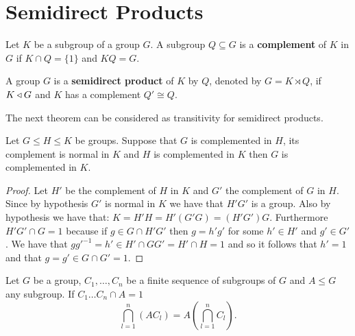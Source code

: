 \section{Semidirect Products}

\begin{definition}
    Let $K$ be a subgroup of a group $G$. A subgroup $Q \subseteq G$ is a \textbf{complement} of $K$ in $G$ if $K \cap Q = \{1\}$ and $KQ = G$.
\end{definition}

\begin{definition}
    A group $G$ is a \textbf{semidirect product} of $K$ by $Q$, denoted by $G = K \rtimes Q$, if $K \triangleleft G$ and $K$ has a complement $Q' \cong Q$.

\end{definition}

The next theorem can be considered as transitivity for semidirect products.

\begin{theorem}
\label{smdptrans}
Let $G \le H \le K$ be groups. Suppose that $G$ is complemented in $H$, its complement is normal in $K$ and $H$ is complemented in $K$ then $G$ is complemented in $K$.
\end{theorem}

\begin{proof}
    \label{S1:SPE}
    Let $H'$ be the complement of $H$ in $K$ and $G'$ the complement of $G$ in $H$. Since by hypothesis $G'$ is normal in $K$ we have that $H'G'$ is a group. Also by hypothesis we have that:
    $K = H'H =H'(G'G) = (H'G')G$.
    Furthermore $H'G' \cap G = 1$ because if $g \in G \cap H'G'$ then $g = h'g'$ for some $h' \in H'$ and $g' \in G'$. We have that $gg'^{-1} = h' \in H' \cap GG' = H' \cap H = 1$ and so it follows that $h' = 1$ and that $g = g' \in G \cap G' = 1$.
\end{proof}

\begin{theorem}
    Let $G$ be a group, $C_1, \ldots , C_n$ be a  finite sequence of subgroups of $G$ and $A \le G$ any subgroup. If $C_1\ldots C_n \cap A = 1$
    $$
    \bigcap_{l = 1}^{n}(AC_l) = A(\bigcap_{l = 1}^{n}C_l).
    $$
\end{theorem}

